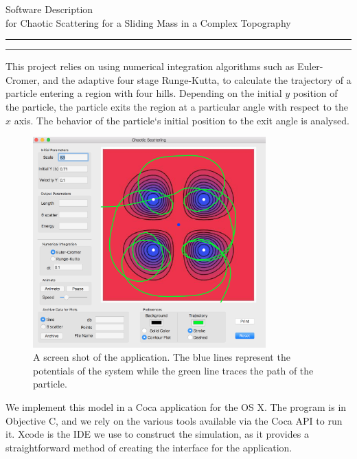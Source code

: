 \documentclass{article}
\newcommand{\soptitle}{Software Description}
\begin{document}
\begin{center}\LARGE\soptitle\\
\large for Chaotic Scattering for a Sliding Mass in a Complex Topography
\end{center}

\hrule
\vspace{1pt}
\hrule height 1pt

\bigskip


{ 
	
	
	\selectfont
	\normalsize{
	This project relies on using  numerical integration algorithms such as Euler-Cromer, and the adaptive four stage Runge-Kutta, to calculate the trajectory of a particle entering a region with four hills. Depending on the initial $y$ position of the particle, the particle exits the region at a particular angle with respect to the $x$ axis. The behavior of the particle`s initial position to the exit angle is analysed. 
	
	
	\begin{figure}[h]
		\centering
		\includegraphics[width=0.8\textwidth]{image1.png}
		\caption{A screen shot of the application. The blue lines represent the potentials of the system while the green line traces the path of the particle. }
		\label{fig:chaos}
	\end{figure}
	
	
	
	We implement this model in a Coca application for the OS X. The program is in Objective C, and we rely on the various tools available via the Coca API to run it. Xcode is the IDE we use to construct the simulation, as it provides a straightforward method of creating the interface for the application. 
 
}}
\end{document}
